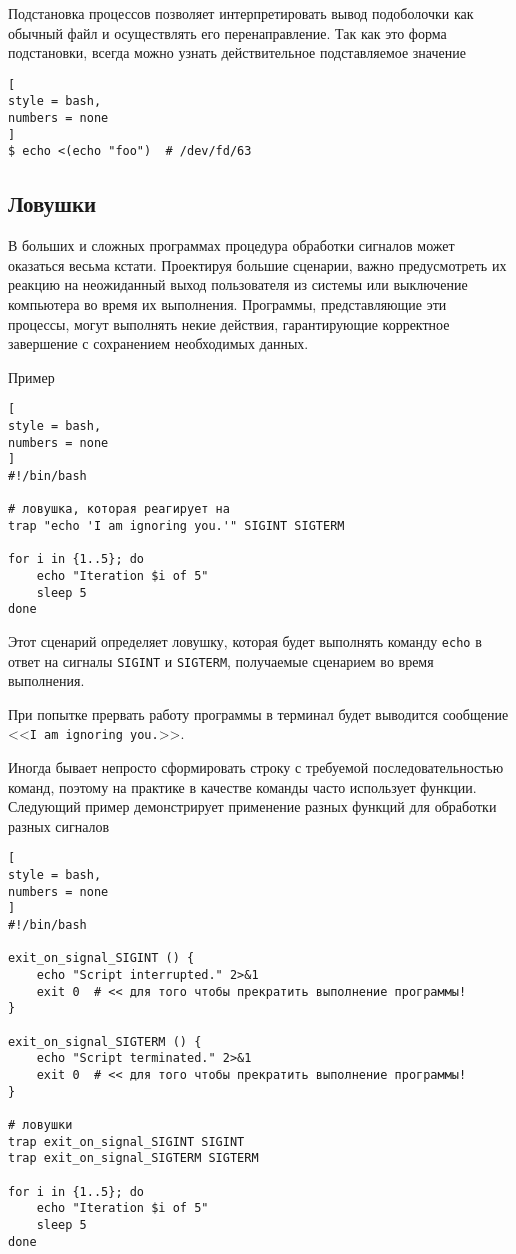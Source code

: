 \documentclass[%
	11pt,
	a4paper,
	utf8,
		]{article}
\begin{document}
Подстановка процессов позволяет интерпретировать вывод подоболочки как обычный файл и осуществлять его перенаправление. Так как это форма подстановки, всегда можно узнать действительное подставляемое значение
\begin{lstlisting}[
style = bash,
numbers = none
]
$ echo <(echo "foo")  # /dev/fd/63
\end{lstlisting}

\subsection{Ловушки}

В больших и сложных программах процедура обработки сигналов может оказаться весьма кстати. Проектируя большие сценарии, важно предусмотреть их реакцию на неожиданный выход пользователя из системы или выключение компьютера во время их выполнения. Программы, представляющие эти процессы, могут выполнять некие действия, гарантирующие корректное завершение с сохранением необходимых данных.

Пример
\begin{lstlisting}[
style = bash,
numbers = none
]
#!/bin/bash

# ловушка, которая реагирует на 
trap "echo 'I am ignoring you.'" SIGINT SIGTERM

for i in {1..5}; do
    echo "Iteration $i of 5"
    sleep 5
done
\end{lstlisting}

Этот сценарий определяет ловушку, которая будет выполнять команду \texttt{echo} в ответ на сигналы \texttt{SIGINT} и \texttt{SIGTERM}, получаемые сценарием во время выполнения.

При попытке прервать работу программы в терминал будет выводится сообщение <<\texttt{I am ignoring you.}>>.

Иногда бывает непросто сформировать строку с требуемой последовательностью команд, поэтому на практике в качестве команды часто использует функции. Следующий пример демонстрирует применение разных функций для обработки разных сигналов
\begin{lstlisting}[
style = bash,
numbers = none
]
#!/bin/bash

exit_on_signal_SIGINT () {
    echo "Script interrupted." 2>&1
    exit 0  # << для того чтобы прекратить выполнение программы!
}

exit_on_signal_SIGTERM () {
    echo "Script terminated." 2>&1
    exit 0  # << для того чтобы прекратить выполнение программы!
}

# ловушки
trap exit_on_signal_SIGINT SIGINT
trap exit_on_signal_SIGTERM SIGTERM

for i in {1..5}; do
    echo "Iteration $i of 5"
    sleep 5
done
\end{lstlisting}
\end{document}
